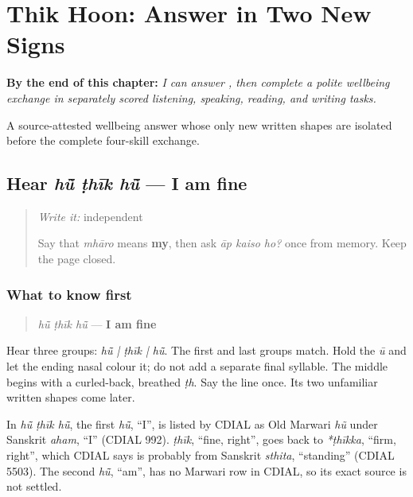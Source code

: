 
\chapter{Thik Hoon: Answer in Two New Signs}
\label{ch:mw-wellbeing-answer}

\begin{chapteropening}
\textbf{By the end of this chapter:} \emph{I can answer   , then complete a polite wellbeing exchange in separately scored listening, speaking, reading, and writing tasks.}

A source-attested wellbeing answer whose only new written shapes are isolated before the complete four-skill exchange.
\end{chapteropening}

\section[hū̃ ṭhīk hū̃]{Hear \emph{hū̃ ṭhīk hū̃} — I am fine}

\label{lesson:MW-C06-hear-answer}



\begin{quote}
\emph{Write it:} independent \textbf{}

Say that \emph{mhāro} means \textbf{my}, then ask \emph{āp kaiso ho?} once from memory. Keep the page closed.
\end{quote}

\subsection*{What to know first}
\begin{quote}
\emph{hū̃ ṭhīk hū̃} — \textbf{I am fine}
\end{quote}

Hear three groups: \emph{hū̃ | ṭhīk | hū̃}. The first and last groups match. Hold the \emph{ū} and let the ending nasal colour it; do not add a separate final syllable. The middle begins with a curled-back, breathed \emph{ṭh}. Say the line once. Its two unfamiliar written shapes come later.

\begin{cousinweb}
In \emph{hū̃ ṭhīk hū̃}, the first \emph{hū̃}, \textquotedblleft{}I\textquotedblright{}, is listed by CDIAL as Old Marwari \emph{hũ} under Sanskrit \emph{aham}, \textquotedblleft{}I\textquotedblright{} (CDIAL 992). \emph{ṭhīk}, \textquotedblleft{}fine, right\textquotedblright{}, goes back to \emph{*ṭhīkka}, \textquotedblleft{}firm, right\textquotedblright{}, which CDIAL says is probably from Sanskrit \emph{sthita}, \textquotedblleft{}standing\textquotedblright{} (CDIAL 5503). The second \emph{hū̃}, \textquotedblleft{}am\textquotedblright{}, has no Marwari row in CDIAL, so its exact source is not settled.
\end{cousinweb}

